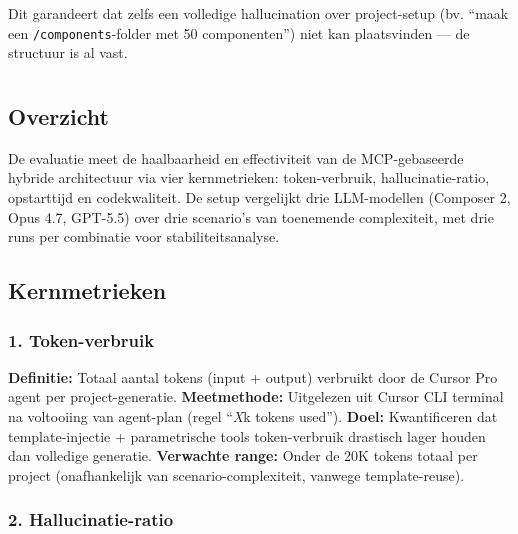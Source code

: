 Dit garandeert dat zelfs een volledige hallucination over project-setup (bv. ``maak een \texttt{/components}-folder met 50 componenten'') niet kan plaatsvinden — de structuur is al vast.

\section{}
\label{sec:poc-evaluation}

\subsection{Overzicht}

De evaluatie meet de haalbaarheid en effectiviteit van de MCP-gebaseerde hybride architectuur via vier kernmetrieken: token-verbruik, hallucinatie-ratio, opstarttijd en codekwaliteit. De setup vergelijkt drie LLM-modellen (Composer 2, Opus 4.7, GPT-5.5) over drie scenario's van toenemende complexiteit, met drie runs per combinatie voor stabiliteitsanalyse.

\subsection{Kernmetrieken}

\subsubsection{1. Token-verbruik}

\noindent
\textbf{Definitie:} Totaal aantal tokens (input + output) verbruikt door de Cursor Pro agent per project-generatie. \newline
\textbf{Meetmethode:} Uitgelezen uit Cursor CLI terminal na voltooiing van agent-plan (regel ``\textit{X}k tokens used''). \newline
\textbf{Doel:} Kwantificeren dat template-injectie + parametrische tools token-verbruik drastisch lager houden dan volledige generatie. \newline
\textbf{Verwachte range:} Onder de 20K tokens totaal per project (onafhankelijk van scenario-complexiteit, vanwege template-reuse).

\subsubsection{2. Hallucinatie-ratio}

